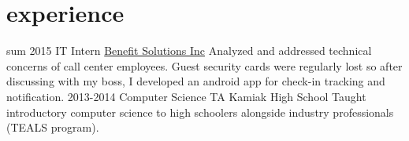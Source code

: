 \documentclass[]{friggeri-cv}
\begin{document}
\section{experience}

\begin{entrylist}
  \entry
    {sum 2015}
    {IT Intern}
    {\href{http://www.bsitpa.com/}{Benefit Solutions Inc}}
    {Analyzed and addressed technical concerns of call center employees. Guest security cards were regularly lost so after discussing with my boss, I developed an android app for check-in tracking and notification.}
  \entry
    {2013-2014}
    {Computer Science TA}
    {Kamiak High School}
    {Taught introductory computer science to high schoolers alongside industry professionals (TEALS program).}
\end{entrylist}






%
\end{document}
